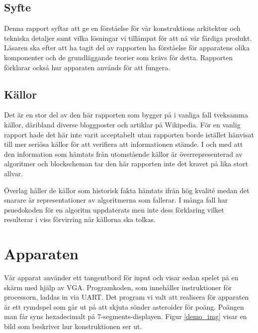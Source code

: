 \documentclass[a4paper]{article}
\begin{document}
    \subsection{Syfte}
    Denna rapport syftar att ge en förståelse för vår konstruktions arkitektur
    och tekniska detaljer samt vilka lösningar vi tillämpat för att nå vår
    färdiga produkt. Läsaren ska efter att ha tagit del av rapporten ha
    förståelse för apparatens olika komponenter och de grundläggande teorier som
    krävs för detta. Rapporten förklarar också hur apparaten används för att
    fungera.


    \subsection{Källor}
    Det är en stor del av den här rapporten som bygger på i vanliga fall tveksamma källor, däribland
    diverse bloggposter och artiklar på Wikipedia. För en vanlig rapport hade det här inte varit
    acceptabelt utan rapporten borde istället hänvisat till mer seriösa källor för att verifiera att
    informationen stämde. I och med att den information som hämtats från utomstående källor är
    överrepresenterad av algoritmer och blockscheman tar den här rapporten inte det kravet på lika
    stort allvar.

    Överlag håller de källor som historisk fakta hämtats ifrån hög kvalité medan det
    snarare är representationer av algoritmerna som fallerar. I många fall har psuedokoden för en
    algoritm uppdaterats men inte dess förklaring vilket resulterar i viss förvirring när källorna
    ska tolkas.
    
    \newpage
        
    \section{Apparaten}
    Vår apparat använder ett tangentbord för input och visar sedan spelet på en
    skärm med hjälp av VGA. Programkoden, som innehåller instruktioner för
    processorn, laddas in via UART. Det program vi valt att realisera för apparaten
    är ett rymdspel som går ut på att skjuta sönder asteroider för poäng. Poängen
    man får syns hexadecimalt på 7-segments-displayen. Figur \ref{demo_img} visar en bild som
    beskriver hur konstruktionen ser ut.
\end{document}
